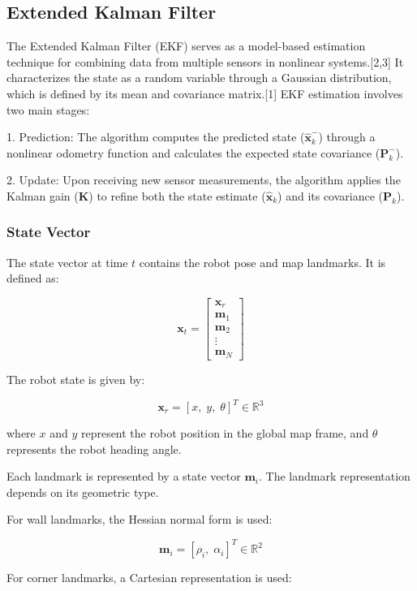 \documentclass[11pt]{article}
\begin{document}
\subsection{Extended Kalman Filter}

The Extended Kalman Filter (EKF) serves as a model-based estimation technique for combining data from multiple sensors in nonlinear systems.[2,3] It characterizes the state as a random variable through a Gaussian distribution, which is defined by its mean and covariance matrix.[1] EKF estimation involves two main stages:

1. Prediction: The algorithm computes the predicted state ($\hat{\mathbf{x}}_k^-$) through a nonlinear odometry function and calculates the expected state covariance ($\mathbf{P}_k^-$).

2. Update: Upon receiving new sensor measurements, the algorithm applies the Kalman gain ($\mathbf{K}$) to refine both the state estimate ($\hat{\mathbf{x}}_k$) and its covariance ($\mathbf{P}_k$). 

\subsubsection{State Vector}

The state vector at time $t$ contains the robot pose and map landmarks.
It is defined as:

\[
\mathbf{x}_t =
\begin{bmatrix}
	\mathbf{x}_r \\
	\mathbf{m}_1 \\
	\mathbf{m}_2 \\
	\vdots \\
	\mathbf{m}_N
\end{bmatrix}
\]

The robot state is given by:

\[
\mathbf{x}_r = [x,\; y,\; \theta]^T \in \mathbb{R}^3
\]

where $x$ and $y$ represent the robot position in the global map frame,
and $\theta$ represents the robot heading angle.

Each landmark is represented by a state vector $\mathbf{m}_i$.
The landmark representation depends on its geometric type.

For wall landmarks, the Hessian normal form is used:

\[
\mathbf{m}_i = [\rho_i,\; \alpha_i]^T \in \mathbb{R}^2
\]


For corner landmarks, a Cartesian representation is used:
\end{document}
